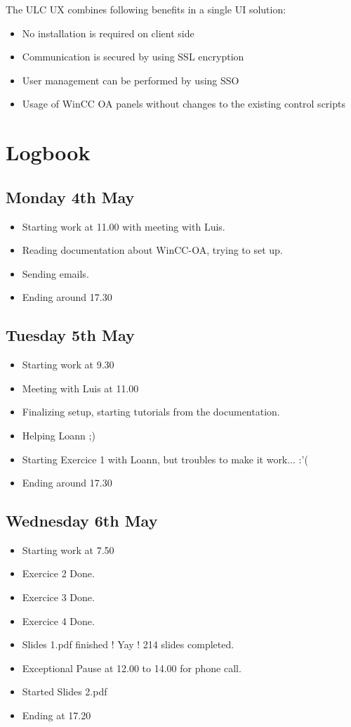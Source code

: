 \documentclass[a4paper, 10pt]{article}
\begin{document}
The ULC UX combines following benefits in a single UI solution:
\begin{itemize}
    \item No installation is required on client side
    \item Communication is secured by using SSL encryption
    \item User management can be performed by using SSO
    \item Usage of WinCC OA panels without changes to the existing control scripts
\end{itemize}

\newpage
\footnotesize
\section{Logbook}
\subsection*{Monday 4th May}
\begin{itemize}
    \item Starting work at 11.00 with meeting with Luis.
    \item Reading documentation about WinCC-OA, trying to set up.
    \item Sending emails.
    \item Ending around 17.30
\end{itemize}

\subsection*{Tuesday 5th May}
\begin{itemize}
    \item Starting work at 9.30
    \item Meeting with Luis at 11.00 
    \item Finalizing setup, starting tutorials from the documentation.
    \item Helping Loann ;)
    \item Starting Exercice 1 with Loann, but troubles to make it work... :'(
    \item Ending around 17.30
\end{itemize}

\subsection*{Wednesday 6th May}
\begin{itemize}
    \item Starting work at 7.50
    \item Exercice 2 Done.
    \item Exercice 3 Done.
    \item Exercice 4 Done.
    \item Slides 1.pdf finished ! Yay ! 214 slides completed.
    \item Exceptional Pause at 12.00 to 14.00 for phone call.
    \item Started Slides 2.pdf
    \item Ending at 17.20
\end{itemize}
\end{document}
